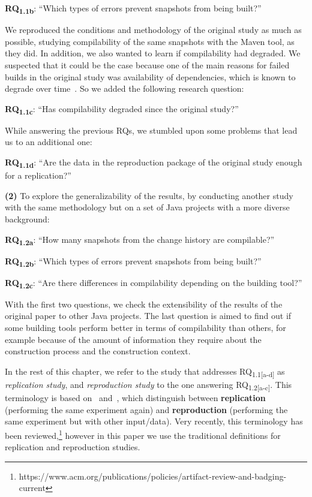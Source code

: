 \textbf{RQ\textsubscript{1.1b}}: ``Which types of errors prevent snapshots from being built?''

We reproduced the conditions and methodology of the original study as much as possible, studying compilability of the same snapshots with the Maven tool, as they did. 
In addition, we also wanted to learn if compilability had degraded. We suspected that it could be the case because one of the main reasons for failed builds in the original study was availability of dependencies, which is known to degrade over time~\cite{bavota2015apache}. So we added the following research question:

\textbf{RQ\textsubscript{1.1c}}: ``Has compilability degraded since the original study?''

While answering the previous RQs, we stumbled upon some problems that lead us to an additional one:

\textbf{RQ\textsubscript{1.1d}}: ``Are the data in the reproduction package of the original study enough for a replication?''

\textbf{(2)} To explore the generalizability of the results, by conducting another study with the same methodology but on a  set of Java projects with a more diverse background:

\textbf{RQ\textsubscript{1.2a}}: ``How many snapshots from the change history are compilable?''

\textbf{RQ\textsubscript{1.2b}}: ``Which types of errors prevent snapshots from being built?''

\textbf{RQ\textsubscript{1.2c}}: ``Are there differences in compilability depending on the building tool?''

With the first two questions, we check the extensibility of the results of the original paper to other Java projects. 
The last question is aimed to find out if some building tools perform better in terms of compilability than others, for example because of the amount of information they require about the construction process and the construction context.

In the rest of this chapter, we refer to the study that addresses RQ\textsubscript{1.1[a-d]} as \emph{replication study}, and \emph{reproduction study} to the one answering RQ\textsubscript{1.2[a-c]}. 
This terminology is based on~\cite{juristo2010replication} and~\cite{cartwright1991replicability}, which distinguish between \textbf{replication} (performing the same experiment again) and \textbf{reproduction} (performing the same experiment but with other input/data). Very recently, this terminology has been reviewed,\footnote{https://www.acm.org/publications/policies/artifact-review-and-badging-current} however in this paper we use the traditional definitions for replication and reproduction studies.

